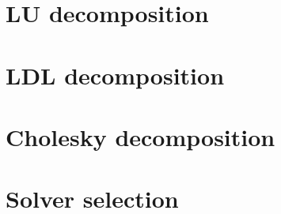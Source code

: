 \documentclass[fontsize = 10pt,DIV = 13]{scrartcl}
\begin{document}
\begin{comment}


\subsection{Notation}

This document uses bold symbols for matrices and vectors.
Bold capital letters like $\mathbf{A}$ are used for matrices.
Lower case bold letters are used for vectors ($\mathbf{r}$, $\mathbf{x}$).
The individual elements of a vector are given by:

\begin{align*}
\mathbf{x}
=
\begin{bmatrix}
x_0\\
x_1\\
\vdots\\
x_{N-1}
\end{bmatrix}
\end{align*}

Zero based indexing is used since this makes it easier to translate the equations into C++ code.


The individual components of the matrix $\mathbf{A}$ can be distinguished by a single column specific character and a zero based row index.
The column specific characters start with the character $a$ for the first column and increase alphabetically.
For example, the components of $\mathbf{A}$ with size $3 \times 3$ are:

\begin{align*}
\mathbf{A}
=
\begin{bmatrix}
a_0&b_0&c_0\\
a_1&b_1&c_1\\
a_2&b_2&c_2
\end{bmatrix}
\end{align*}

This element naming is chosen because it can be easier translated into vectorized code than the common double index notation.
\end{comment}






\section{LU decomposition}
\label{sec:LU}

\section{LDL decomposition}
\label{sec:LDL}

\section{Cholesky decomposition}
\label{sec:choleskyDecomposition}

\section{Solver selection}
\label{sec:solverSelection}
\end{document}
